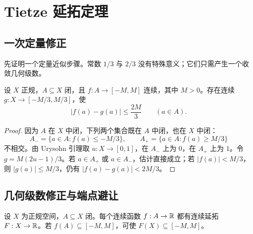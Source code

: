 \section{Tietze 延拓定理}

\subsection{一次定量修正}

先证明一个定量近似步骤。常数 \(1/3\) 与 \(2/3\) 没有特殊意义；它们只需产生一个收敛几何级数。

\begin{lemma}[延拓近似]
\label{lem:tietze-approximation}
设 \(X\) 正规，\(A\subseteq X\) 闭，且 \(f:A\to[-M,M]\) 连续，其中 \(M>0\)。存在连续 \(g:X\to[-M/3,M/3]\)，使
\[
 |f(a)-g(a)|\le\frac{2M}{3}\qquad(a\in A).
\]
\end{lemma}

\begin{proof}
因为 \(A\) 在 \(X\) 中闭，下列两个集合既在 \(A\) 中闭，也在 \(X\) 中闭：
\[
 A_-=\{a\in A:f(a)\le-M/3\},\qquad
 A_+=\{a\in A:f(a)\ge M/3\}
\]
不相交。由 Urysohn 引理取 \(u:X\to[0,1]\)，在 \(A_-\) 上为 \(0\)，在 \(A_+\) 上为 \(1\)。令 \(g=M(2u-1)/3\)。若 \(a\in A_+\) 或 \(a\in A_-\)，估计直接成立；若 \(|f(a)|<M/3\)，则 \(|g(a)|\le M/3\)，仍有 \(|f(a)-g(a)|<2M/3\)。
\end{proof}

\subsection{几何级数修正与端点避让}

\begin{theorem}
\label{thm:tietze-extension}
设 \(X\) 为正规空间，\(A\subseteq X\) 闭。每个连续函数 \(f:A\to\mathbb{R}\) 都有连续延拓 \(F:X\to\mathbb{R}\)。若 \(f(A)\subseteq[-M,M]\)，可使 \(F(X)\subseteq[-M,M]\)。
\end{theorem}

